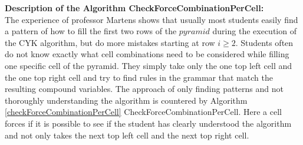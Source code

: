 \noindent \textbf{Description of the Algorithm CheckForceCombinationPerCell: }\\
The experience of professor Martens shows that usually most students easily find a pattern of how to fill the first two rows of the $pyramid$ during the execution of the CYK algorithm, but do more mistakes starting at row $i\geq2$. Students often do not know exactly what cell combinations need to be considered while filling one specific cell of the pyramid. They simply take only the one top left cell and the one top right cell and try to find rules in the grammar that match the resulting compound variables. The approach of only finding patterns and not thoroughly understanding the algorithm is countered by Algorithm \ref{checkForceCombinationPerCell} CheckForceCombinationPerCell. Here a cell forces if it is possible to see if the student has clearly understood the algorithm and not only takes the next top left cell and the next top right cell.\\

\noindent 
{}

